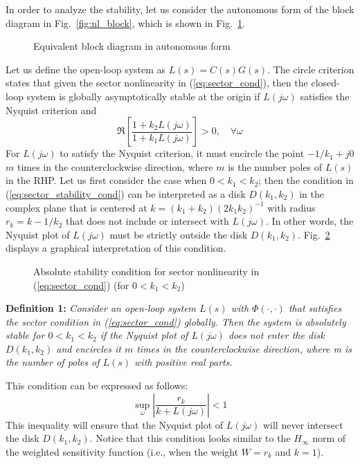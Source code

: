 \documentclass[12pt]{article}
\begin{document}
In order to analyze the stability, let us consider the autonomous form of the block diagram in Fig.~\ref{fig:nl_block}, which is shown in Fig.~\ref{fig:nl_block_reform}. 
\begin{figure}
\centering
\resizebox{1\columnwidth}{!}{}
\caption{Equivalent block diagram in autonomous form}
\label{fig:nl_block_reform}
\end{figure}
Let us define the open-loop system as $L(s) = C(s)G(s)$. The circle criterion states that given the sector nonlinearity in (\ref{eq:sector_cond}), then the closed-loop system is globally asymptotically stable at the origin if $L(j\omega)$ satisfies the Nyquist criterion and 
\begin{equation} \label{eq:sector_stability_cond}
\Re \left[  \frac{1+k_2L(j\omega)}{1+k_1L(j\omega)} \right] > 0, \quad \forall \omega
\end{equation}
For $L(j\omega)$ to satisfy the Nyquist criterion, it must encircle the point $-1/k_1 + j0$ $m$ times in the counterclockwise direction, where $m$ is the number poles of $L(s)$ in the RHP.  Let us first consider the case when $0< k_1 < k_2$; then the condition in (\ref{eq:sector_stability_cond}) can be interpreted as a disk $D(k_1,k_2)$ in the complex plane that is centered at $k = (k_1+k_2)(2k_1k_2)^{-1}$ with radius $r_k = k - 1/k_2$ that does not include or intersect with $L(j\omega)$. In other words, the Nyquist plot of $L(j\omega)$ must be strictly outside the disk $D(k_1,k_2)$. Fig.~\ref{fig:complex_circ} displays a graphical interpretation of this condition. 
\begin{figure}
\centering
\resizebox{1\columnwidth}{!}{}
\caption{Absolute stability condition for sector nonlinearity in (\ref{eq:sector_cond}) (for $0 < k_1 < k_2$)}
\label{fig:complex_circ}
\end{figure}

\textbf{Definition 1:} \textit{Consider an open-loop system $L(s)$ with $\Phi(\cdot,\cdot)$ that satisfies the sector condition in (\ref{eq:sector_cond}) globally. Then the system is absolutely stable for $0 < k_1 < k_2 $ if the Nyquist plot of $L(j\omega)$ does not enter the disk $D(k_1,k_2)$ and encircles it $m$ times in the counterclockwise direction, where m is the number of poles of $L(s)$ with positive real parts.}

This condition can be expressed as follows:
\begin{equation} \label{eq:stab_ineq_1}
\sup_\omega \left\lvert \frac{r_k}{k+L(j\omega)} \right\lvert < 1
\end{equation}
This inequality will ensure that the Nyquist plot of $L(j\omega)$ will never intersect the disk $D(k_1,k_2)$. Notice that this condition looks similar to the $H_\infty$ norm of the weighted sensitivity function (i.e., when the weight $W = r_k$ and $k = 1$). 
\end{document}
